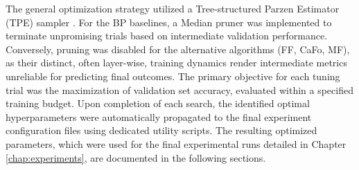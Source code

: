 \documentclass[11pt, english]{article}
\begin{document}
The general optimization strategy utilized a Tree-structured Parzen Estimator (TPE) sampler \cite{bergstra2011algorithms}. For the BP baselines, a Median pruner was implemented to terminate unpromising trials based on intermediate validation performance. Conversely, pruning was disabled for the alternative algorithms (FF, CaFo, MF), as their distinct, often layer-wise, training dynamics render intermediate metrics unreliable for predicting final outcomes. The primary objective for each tuning trial was the maximization of validation set accuracy, evaluated within a specified training budget. Upon completion of each search, the identified optimal hyperparameters were automatically propagated to the final experiment configuration files using dedicated utility scripts. The resulting optimized parameters, which were used for the final experimental runs detailed in Chapter \ref{chap:experiments}, are documented in the following sections.
\end{document}

